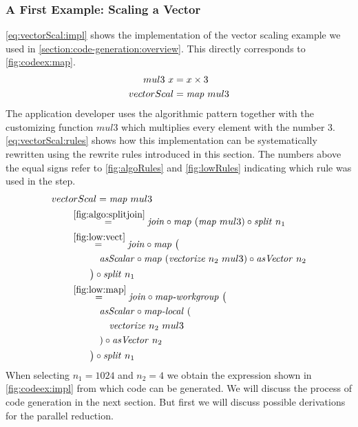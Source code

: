 \subsubsection{A First Example: Scaling a Vector}
\autoref{eq:vectorScal:impl} shows the implementation of the vector scaling example we used in \autoref{section:code-generation:overview}.
This directly corresponds to \autoref{fig:codeex:map}.
\begin{align}
  mul3\ x &= x \times 3\nonumber\\
  vectorScal &= \text{\textit{map}}\ mul3
  \label{eq:vectorScal:impl}
\end{align}
The application developer uses the algorithmic pattern \map together with the customizing function $mul3$ which multiplies every element with the number $3$.
\autoref{eq:vectorScal:rules} shows how this implementation can be systematically rewritten using the rewrite rules introduced in this section.
The numbers above the equal signs refer to \autoref{fig:algoRules} and \autoref{fig:lowRules} indicating which rule was used in the step.
\begin{align}
  &vectorScal = \text{\textit{map}}\ mul3\nonumber\\
  &\qquad\begin{aligned}
    &\overset{\ref{fig:algo:splitjoin}}{=\hspace{.2em}}
      \text{\textit{join}} \circ \text{\textit{map}}\ (\text{\textit{map}}\ mul3) \circ \text{\textit{split}}\ n_1\\
    &\overset{\ref{fig:low:vect}}{=\hspace{.2em}}
      \text{\textit{join}} \circ \text{\textit{map}}\ \big(\\
      &\qquad\quad \text{\textit{asScalar}} \circ \text{\textit{map}}\ (\text{\textit{vectorize}}\ n_2\ mul3) \circ \text{\textit{asVector}}\ n_2\\
      &\qquad\big) \circ \text{\textit{split}}\ n_1\\
    &\overset{\ref{fig:low:map}}{=\hspace{.2em}}
      \text{\textit{join}} \circ \text{\textit{map-workgroup}}\ \big(\\
      &\qquad\quad \text{\textit{asScalar}} \circ \text{\textit{map-local}}\ (\\
      &\qquad\qquad\text{\textit{vectorize}}\ n_2\ mul3\\
      &\qquad\quad) \circ \text{\textit{asVector}}\ n_2\\
      &\qquad\big) \circ \text{\textit{split}}\ n_1
  \end{aligned}
  \label{eq:vectorScal:rules}
\end{align}
When selecting $n_1=1024$ and $n_2=4$ we obtain the expression shown in \autoref{fig:codeex:impl} from which \OpenCL code can be generated.
We will discuss the process of \OpenCL code generation in the next section.
But first we will discuss possible derivations for the parallel reduction.

